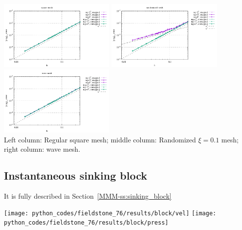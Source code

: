 \begin{center}
\includegraphics[width=5.7cm]{python_codes/fieldstone_76/results/bench9/reg/errors_P}
\includegraphics[width=5.7cm]{python_codes/fieldstone_76/results/bench9/rand/errors_P}
\includegraphics[width=5.7cm]{python_codes/fieldstone_76/results/bench9/wave/errors_P}\\
{\captionfont Left column: Regular square mesh; middle column: Randomized $\xi=0.1$ mesh;
right column: wave mesh.}
\end{center}


\newpage
\subsection*{Instantaneous sinking block}

It is fully described in Section~\ref{MMM-ss:sinking_block}

\begin{center}
\texttt{[image: python\_codes/fieldstone\_76/results/block/vel]}
\texttt{[image: python\_codes/fieldstone\_76/results/block/press]}
\end{center}


